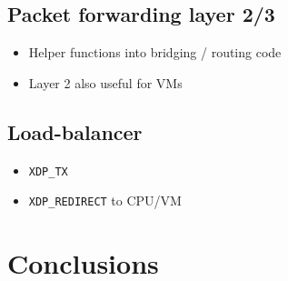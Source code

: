 \documentclass[10pt]{sig-alternate-05-2015}
\begin{document}
\subsection{Packet forwarding layer 2/3}
\label{sec:org3681460}
\begin{itemize}
\item Helper functions into bridging / routing code
\item Layer 2 also useful for VMs
\end{itemize}
\subsection{Load-balancer}
\label{sec:org685e28c}
\begin{itemize}
\item \texttt{XDP\_TX}
\item \texttt{XDP\_REDIRECT} to CPU/VM
\end{itemize}
\section{Conclusions}
\label{sec:conclusion}







\end{document}
